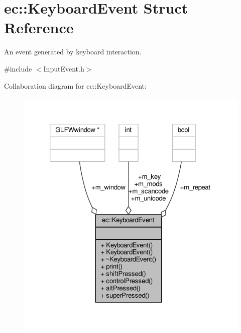\hypertarget{structec_1_1_keyboard_event}{}\section{ec\+:\+:Keyboard\+Event Struct Reference}
\label{structec_1_1_keyboard_event}


An event generated by keyboard interaction.  




{\ttfamily \#include $<$Input\+Event.\+h$>$}



Collaboration diagram for ec\+:\+:Keyboard\+Event\+:\nopagebreak
\begin{figure}[H]
\begin{center}
\leavevmode
\includegraphics[width=327pt]{structec_1_1_keyboard_event__coll__graph}
\end{center}
\end{figure}
